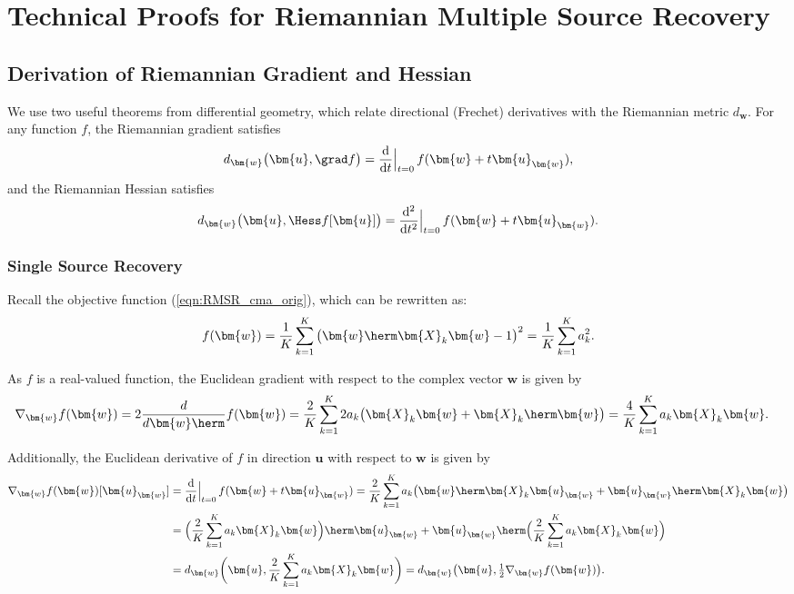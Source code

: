 \chapter{Technical Proofs for Riemannian Multiple Source Recovery}\label{appdx:rmsr}









\section{Derivation of Riemannian Gradient and Hessian} \label{appdxrtr:riemannDerivations}
We use two useful theorems from differential geometry, which relate directional (Frechet) derivatives with the Riemannian metric $d_{\bm{w}}$. For any function $f$, the Riemannian gradient satisfies
\begin{equation}
d_{\bm{w}}\big(\bm{u},\grad f\big)= \frac{\mathrm{d}}{\mathrm{d}t}\Big|_{t=0}\,f(\bm{w}+t\bm{u}_{\bm{w}}), \label{eqn:gradmetric}
\end{equation}
and the Riemannian Hessian satisfies
\begin{equation}
d_{\bm{w}}\big(\bm{u},\Hess f[\bm{u}]\big)= \frac{\mathrm{d}^2}{\mathrm{d}t^2}\Big|_{t=0}\,f(\bm{w}+t\bm{u}_{\bm{w}}). \label{eqn:hessmetric}
\end{equation}

\subsection{Single Source Recovery}
Recall the objective function (\ref{eqn:RMSR_cma_orig}), which can be rewritten as:
\begin{equation}
f(\bm{w})=\frac{1}{K}\sum_{k=1}^K\big(\bm{w}\herm\bm{X}_k\bm{w}-1\big)^2=\frac{1}{K}\sum_{k=1}^Ka_k^2.
\end{equation}

As $f$ is a real-valued function, the Euclidean gradient with respect to the complex vector $\bm{w}$ is given by
\begin{align}
\nabla_{\bm{w}}f(\bm{w})&=2\frac{d}{d\bm{w}\herm}f(\bm{w})=\frac{2}{K}\sum_{k=1}^K 2a_k\big(\bm{X}_k\bm{w}+\bm{X}_k\herm\bm{w}\big)=\frac{4}{K}\sum_{k=1}^K a_k\bm{X}_k\bm{w}.
\end{align}

Additionally, the Euclidean derivative of $f$ in direction $\bm{u}$ with respect to $\bm{w}$ is given by
\begin{align}
\nabla_{\bm{w}}f(\bm{w})[\bm{u}_{\bm{w}}]&=\frac{\mathrm{d}}{\mathrm{d}t}\Big|_{t=0}\,f(\bm{w}+t\bm{u}_{\bm{w}})=\frac{2}{K}\sum_{k=1}^Ka_k\big(\bm{w}\herm\bm{X}_k\bm{u}_{\bm{w}}+\bm{u}_{\bm{w}}\herm\bm{X}_k\bm{w}\big)\nonumber\\
&=\Big(\frac{2}{K}\sum_{k=1}^Ka_k\bm{X}_k\bm{w}\Big)\herm\bm{u}_{\bm{w}}+\bm{u}_{\bm{w}}\herm\Big(\frac{2}{K}\sum_{k=1}^Ka_k\bm{X}_k\bm{w}\Big)\nonumber\\
&=d_{\bm{w}}\bigg(\bm{u},\frac{2}{K}\sum_{k=1}^Ka_k\bm{X}_k\bm{w}\bigg)=d_{\bm{w}}\big(\bm{u},\tfrac{1}{2}\nabla_{\bm{w}}f(\bm{w})\big).
\end{align}

